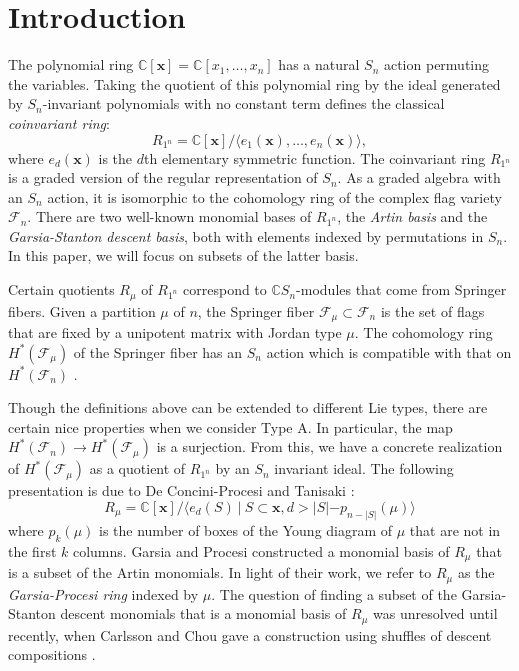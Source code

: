 \documentclass[ALCO, Unicode]{cedram}
\begin{document}
\section{Introduction}
The polynomial ring $\mathbb{C}[\mathbf{x}] = \mathbb{C}[x_1,\dots, x_n]$ has a natural $S_n$ action permuting the variables. 
Taking the quotient of this polynomial ring by the ideal generated by $S_n$-invariant polynomials with no constant term defines the classical \textit{coinvariant ring}:
\[R_{1^n}= \mathbb{C}[\mathbf{x}]/\langle e_1(\mathbf{x}),\dots,  e_n(\mathbf{x})\rangle,\] where $e_d(\mathbf{x})$ is the $d$th elementary symmetric function. 
The coinvariant ring $R_{1^n}$ is a graded version of the regular representation of $S_n$.
As a graded algebra with an $S_n$ action, it is isomorphic to the cohomology ring of the complex flag variety $\mathcal{F}_n$. 
There are two well-known monomial bases of $R_{1^n}$, the \textit{Artin basis} and the \textit{Garsia-Stanton descent basis}, both with elements indexed by permutations in $S_n$. 
In this paper, we will focus on subsets of the latter basis. 
  
Certain quotients $R_\mu$ of $R_{1^n}$ correspond to $\mathbb{C}S_n$-modules that come from Springer fibers. 
Given a partition $\mu$ of $n$, the Springer fiber $\mathcal{F}_\mu\subset \mathcal{F}_n$  is the set of flags that are fixed by a unipotent matrix with Jordan type $\mu$. The cohomology ring $H^{*}(\mathcal{F}_\mu)$ of the Springer fiber has an $S_n$ action which is compatible with that on $H^{*}(\mathcal{F}_n)$ \cite{Springer1978}. 

Though the definitions above can be extended to different Lie types, there are certain nice properties when we consider Type A. In particular, the map $H^*(\mathcal{F}_n) \to H^*(\mathcal{F}_\mu)$ is a surjection. 
From this, we have a concrete realization of $H^*(\mathcal{F}_\mu)$ as a quotient of $R_{1^n}$ by an $S_n$ invariant ideal. The following presentation is due to De Concini-Procesi \cite{deCon-Proc} and Tanisaki \cite{Tanisaki}:
\[R_\mu = \mathbb{C}[\mathbf{x}]/\langle e_d(S) \ | \ S\subset \mathbf{x}, d> |S| -p_{n-|S|}(\mu) \rangle\]
where $p_{k}(\mu)$ is the number of boxes of the Young diagram of $\mu$ that are not in the first $k$ columns.
Garsia and Procesi \cite{GP} constructed a monomial basis of $R_\mu$ that is a subset of the Artin monomials.
In light of their work, we refer to $R_\mu$ as the \textit{Garsia-Procesi ring} indexed by $\mu$. 
The question of finding a subset of the Garsia-Stanton descent monomials that is a monomial basis of $R_\mu$ was unresolved until recently, when Carlsson and Chou gave a construction using shuffles of descent compositions  \cite{CC}. 
\end{document}
